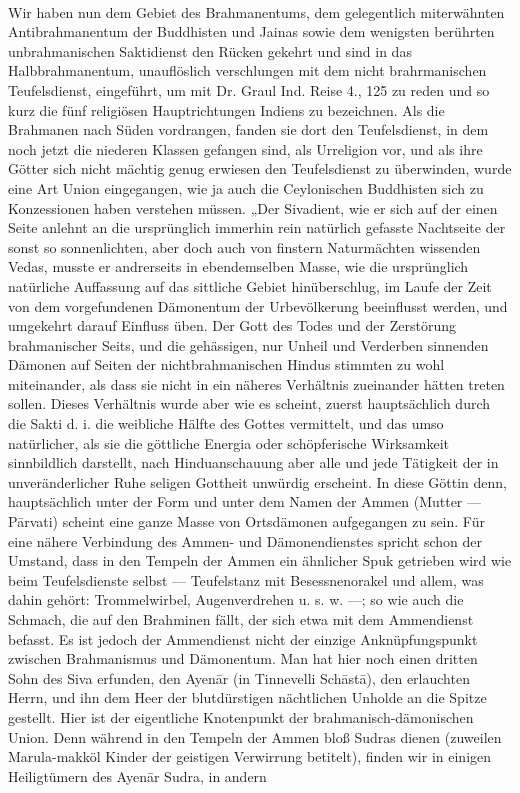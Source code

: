 \documentclass{article}
\begin{document}
\begin{center}
\end{center}
\paragraph{}
Wir haben nun dem Gebiet des Brahmanentums, dem gelegentlich miterwähnten Antibrahmanentum der Buddhisten und Jainas sowie dem wenigsten berührten unbrahmanischen Saktidienst den Rücken gekehrt und sind in das Halbbrahmanentum, unauflöslich verschlungen mit dem nicht brahrmanischen Teufelsdienst, eingeführt, um mit Dr. Graul Ind. Reise 4., 125 zu reden und so kurz die fünf religiösen Hauptrichtungen Indiens zu bezeichnen. Als die Brahmanen nach Süden vordrangen, fanden sie dort den Teufelsdienst, in dem noch jetzt die niederen Klassen gefangen sind, als Urreligion vor, und als ihre Götter sich nicht mächtig genug erwiesen den Teufelsdienst zu überwinden, wurde eine Art Union eingegangen, wie ja auch die Ceylonischen Buddhisten sich zu Konzessionen haben verstehen müssen. „Der Sivadient, wie er sich auf der einen Seite anlehnt an die ursprünglich immerhin rein natürlich gefasste Nachtseite der sonst so sonnenlichten, aber doch auch von finstern Naturmächten wissenden Vedas, musste er andrerseits in ebendemselben Masse, wie die ursprünglich natürliche Auffassung auf das sittliche Gebiet hinüberschlug, im Laufe der Zeit von dem vorgefundenen Dämonentum der Urbevölkerung beeinflusst werden, und umgekehrt darauf Einfluss üben. Der Gott des Todes und der Zerstörung brahmanischer Seits, und die gehässigen, nur Unheil und Verderben sinnenden Dämonen auf Seiten der nichtbrahmanischen Hindus stimmten zu wohl miteinander, als dass sie nicht in ein näheres Verhältnis zueinander hätten treten sollen. Dieses Verhältnis wurde aber wie es scheint, zuerst hauptsächlich durch die Sakti d. i. die weibliche Hälfte des Gottes vermittelt, und das umso natürlicher, als sie die göttliche Energia oder schöpferische Wirksamkeit sinnbildlich darstellt, nach Hinduanschauung aber alle und jede Tätigkeit der in unveränderlicher Ruhe seligen Gottheit unwürdig erscheint. In diese Göttin denn, hauptsächlich unter der Form und unter dem Namen der Ammen (Mutter — P\={a}rvati) scheint eine ganze Masse von Ortsdämonen aufgegangen zu sein. Für eine nähere Verbindung des Ammen- und Dämonendienstes spricht schon der Umstand, dass in den Tempeln der Ammen ein ähnlicher Spuk getrieben wird wie beim Teufelsdienste selbst — Teufelstanz mit Besessnenorakel und allem, was dahin gehört: Trommelwirbel, Augenverdrehen u. s. w. —; so wie auch die Schmach, die auf den Brahminen fällt, der sich etwa mit dem Ammendienst befasst. Es ist jedoch der Ammendienst nicht der einzige Anknüpfungspunkt zwischen Brahmanismus und Dämonentum. Man hat hier noch einen dritten Sohn des Siva erfunden, den Ayen\={a}r (in Tinnevelli Sch\={a}st\={a}), den erlauchten Herrn, und ihn dem Heer der blutdürstigen nächtlichen Unholde an die Spitze gestellt. Hier ist der eigentliche Knotenpunkt der brahmanisch-dämonischen Union. Denn während in den Tempeln der Ammen bloß Sudras dienen (zuweilen Marula-makköl Kinder der geistigen Verwirrung betitelt), finden wir in einigen Heiligtümern des Ayen\={a}r Sudra, in andern 
\end{document}
